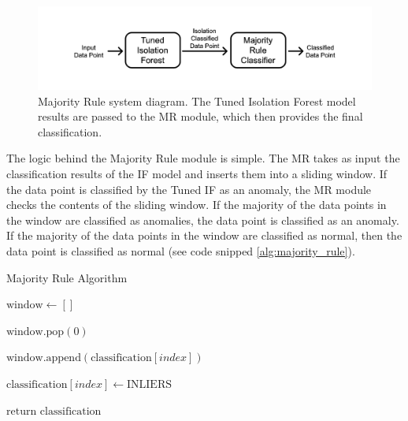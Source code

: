 \documentclass[futureinternet,article,submit,pdftex,moreauthors]{Definitions/mdpi}
\begin{document}
\begin{figure}[H]
	\centering
	\includegraphics[width=12.5 cm]{img/ModulesStructure.jpg}
	\caption{Majority Rule system diagram. The Tuned Isolation Forest model results are passed to the MR module, which then provides the final classification.}
	\label{fig:MajorityRuleDiagram}
	\end{figure}   


The logic behind the Majority Rule module is simple. The MR takes as input the classification results of the IF model and inserts them into a sliding window. If the data point is classified by the Tuned IF as an anomaly, the MR module checks the contents of the sliding window. If the 
majority of the data points in the window are classified as anomalies, the data point is classified as an anomaly. If the majority of the data points in the window are classified as normal, then the data point is classified as normal (see code snipped \ref{alg:majority_rule}).

\begin{algorithm}
	\caption{Majority Rule Algorithm}\label{alg:majority_rule}
	\begin{algorithmic}[1]
		\State \hspace{1em} $\text{window} \leftarrow []$
		
				\State \hspace{1em} $\text{window.pop}(0)$
			\EndIf
			
			\State \hspace{1em} $\text{window.append}(\text{classification}[index])$
			
				\State \hspace{1em} $\text{classification}[index] \leftarrow \text{INLIERS}$
			\EndIf
		\EndFor
		
		\State \hspace{1em} $\text{return classification}$
	\end{algorithmic}
\end{algorithm}
\end{document}
